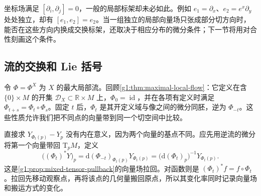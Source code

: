 \ProseParagraphBreak

坐标场满足 \([\partial_i,\partial_j]=0\)，一般的局部标架却未必如此。例如 \(e_1=\partial_x\)、\(e_2=e^x\partial_y\) 处处独立，却有 \([e_1,e_2]=e_2\)。当一组独立的局部向量场只张成部分切方向时，能否在这些方向内换成交换标架，还取决于相应分布的微分条件；下一节将用对合性刻画这个条件。

\subsection{流的交换和 Lie 括号}
\label{g1:subsec:1303:02}

令 \(\Phi=\Phi^X\) 为 \(X\) 的最大局部流。回顾\cref{g1:thm:maximal-local-flow}：它定义在含 \(\{0\}\times M\) 的开集 \(\mathcal D_X\subset\mathbb R\times M\) 上，\(\Phi_0=\operatorname{id}\)，并在各项有定义时满足 \(\Phi_{t+s}=\Phi_t\circ\Phi_s\)。固定 \(t\) 后，\(\Phi_t\) 是其开定义域与像之间的微分同胚，逆为 \(\Phi_{-t}\)。这些性质允许我们把不同点的向量带到同一个切空间中比较。

\ProseParagraphBreak

直接求 \(Y_{\Phi_t(p)}-Y_p\) 没有内在意义，因为两个向量的基点不同。应先用逆流的微分将第一个向量带回 \(\mathrm{T}_pM\)，定义
\begin{equation}
	\label{g1:eq:flow-vector-pullback}
	\bigl((\Phi_t)^*Y\bigr)_p
	=\mathrm{d}(\Phi_{-t})_{\Phi_t(p)}Y_{\Phi_t(p)}
	=\bigl(\mathrm{d}(\Phi_t)_p\bigr)^{-1}Y_{\Phi_t(p)}.
\end{equation}
这是\cref{g1:prop:mixed-tensor-pullback}的向量场拉回。对函数则是 \((\Phi_t)^*f=f\circ\Phi_t\)。拉回先移动观察点，再将该点的几何量搬回原点，所以其变化率同时记录向量场和搬运方式的变化。

